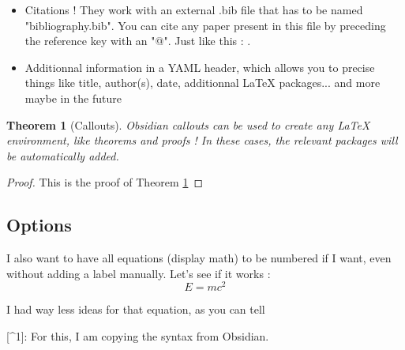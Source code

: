 \documentclass{article}
\newtheorem{theorem}{Theorem}
\begin{document}
\begin{maincontent}
\begin{itemize}
\item 
Citations ! They work with an external .bib file that has to be named "bibliography.bib". You can cite any paper present in this file by preceding the reference key with an "@". Just like this : \cite{Einstein}.

\item 
Additionnal information in a YAML header, which allows you to precise things like title, author(s), date, additionnal LaTeX packages... and more maybe in the future

\end{itemize}
\begin{theorem}[Callouts]

Obsidian callouts can be used to create any LaTeX environment, like theorems and proofs ! In these cases, the relevant packages will be automatically added.\label{main-theorem}
\end{theorem}
\begin{proof}

This is the proof of Theorem \ref{main-theorem}
\end{proof}

\subsection{Options}

I also want to have all equations (display math) to be numbered if I want, even without adding a label manually. Let's see if it works :
\begin{equation}
	E=mc^2
\end{equation}


I had way less ideas for that equation, as you can tell

[\^{}1]: For this, I am copying the syntax from Obsidian.

\end{maincontent}
\printbibliography
\end{document}
